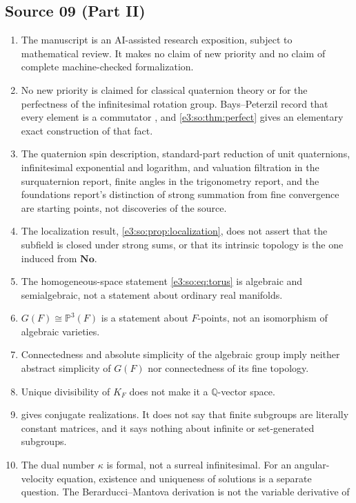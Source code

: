\documentclass[11pt,letterpaper]{article}
\numberwithin{equation}{section}
\theoremstyle{definition}
\theoremstyle{remark}
\newcommand{\No}{\mathbf{No}}
\newcommand{\Q}{\mathbb Q}
\begin{document}
\subsection{Source 09 (Part II)}\label{e3:sub:nonclaims09}
\begin{enumerate}[label=\textup{S\arabic*.},leftmargin=2.6em]
\item The manuscript is an AI-assisted research exposition, subject to
 mathematical review. It makes no claim of new priority and no claim of
 complete machine-checked formalization.
\item No new priority is claimed for classical quaternion theory or for the
 perfectness of the infinitesimal rotation group. Bays--Peterzil record that
 every element is a commutator \cite[\S3.1]{BP}, and \cref{e3:so:thm:perfect}
 gives an elementary exact construction of that fact.
\item The quaternion spin description, standard-part reduction of unit
 quaternions, infinitesimal exponential and logarithm, and valuation filtration
 in the surquaternion report, finite angles in the trigonometry report, and the
 foundations report's distinction of strong summation from fine convergence are
 starting points, not discoveries of the source.
\item The localization result, \cref{e3:so:prop:localization}, does not
 assert that the subfield is closed under strong sums, or that its intrinsic
 topology is the one induced from $\No$.
\item The homogeneous-space statement \cref{e3:so:eq:torus} is algebraic and
 semialgebraic, not a statement about ordinary real manifolds.
\item $G(F)\cong\mathbb P^3(F)$ is a statement about $F$-points, not an
 isomorphism of algebraic varieties.
\item Connectedness and absolute simplicity of the algebraic group imply
 neither abstract simplicity of $G(F)$ nor connectedness of its fine
 topology.
\item Unique divisibility of $K_F$ does not make it a $\Q$-vector space.
\item {} gives conjugate realizations. It does not
 say that finite subgroups are literally constant matrices, and it says nothing
 about infinite or set-generated subgroups.
\item The dual number $\kappa$ is formal, not a surreal infinitesimal. For an
 angular-velocity equation, existence and uniqueness of solutions is a separate
 question. The Berarducci--Mantova derivation is not the variable derivative of

\end{enumerate}
\end{document}
